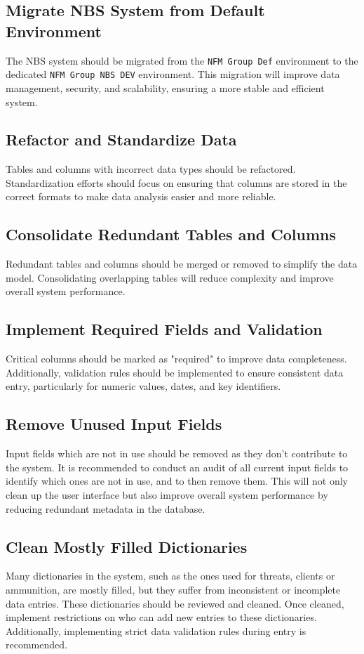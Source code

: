 \subsection{Migrate NBS System from Default Environment}
The NBS system should be migrated from the \texttt{NFM Group Def} environment to the dedicated \texttt{NFM Group NBS DEV} environment. This migration will improve data management, security, and scalability, ensuring a more stable and efficient system.

\subsection{Refactor and Standardize Data}
Tables and columns with incorrect data types should be refactored. Standardization efforts should focus on ensuring that columns are stored in the correct formats to make data analysis easier and more reliable.

\subsection{Consolidate Redundant Tables and Columns}
Redundant tables and columns should be merged or removed to simplify the data model. Consolidating overlapping tables will reduce complexity and improve overall system performance.

\subsection{Implement Required Fields and Validation}
Critical columns should be marked as "required" to improve data completeness. Additionally, validation rules should be implemented to ensure consistent data entry, particularly for numeric values, dates, and key identifiers.

\subsection{Remove Unused Input Fields}
Input fields which are not in use should be removed as they don't contribute to the system. It is recommended to conduct an audit of all current input fields to identify which ones are not in use, and to then remove them. This will not only clean up the user interface but also improve overall system performance by reducing redundant metadata in the database. 

\subsection{Clean Mostly Filled Dictionaries}
Many dictionaries in the system, such as the ones used for threats, clients or ammunition, are mostly filled, but they suffer from inconsistent or incomplete data entries. These dictionaries should be reviewed and cleaned. Once cleaned, implement restrictions on who can add new entries to these dictionaries. Additionally, implementing strict data validation rules during entry is recommended.

